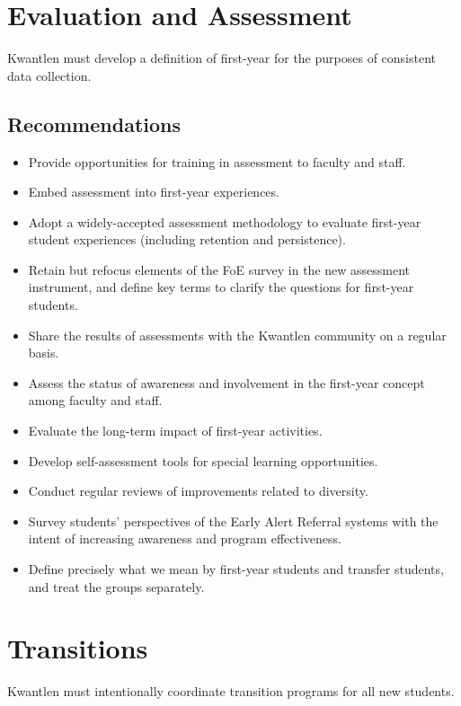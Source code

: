 \documentclass[10pt, letterpaper]{article}
\begin{document}
\section{Evaluation and Assessment}

Kwantlen must develop a definition of first-year for the purposes of
consistent data collection.

\subsection{Recommendations}

\begin{itemize}
\item
  Provide opportunities for training in assessment to faculty and staff.
\item
  Embed assessment into first-year experiences.
\item
  Adopt a widely-accepted assessment methodology to evaluate first-year
  student experiences (including retention and persistence).
\item
  Retain but refocus elements of the FoE survey in the new assessment
  instrument, and define key terms to clarify the questions for
  first-year students.
\item
  Share the results of assessments with the Kwantlen community on a
  regular basis.
\item
  Assess the status of awareness and involvement in the first-year
  concept among faculty and staff.
\item
  Evaluate the long-term impact of first-year activities.
\item
  Develop self-assessment tools for special learning opportunities.
\item
  Conduct regular reviews of improvements related to diversity.
\item
  Survey students' perspectives of the Early Alert Referral systems with
  the intent of increasing awareness and program effectiveness.
\item
  Define precisely what we mean by first-year students and transfer
  students, and treat the groups separately.
\end{itemize}

\section{Transitions}

Kwantlen must intentionally coordinate transition programs for all new
students.
\end{document}
